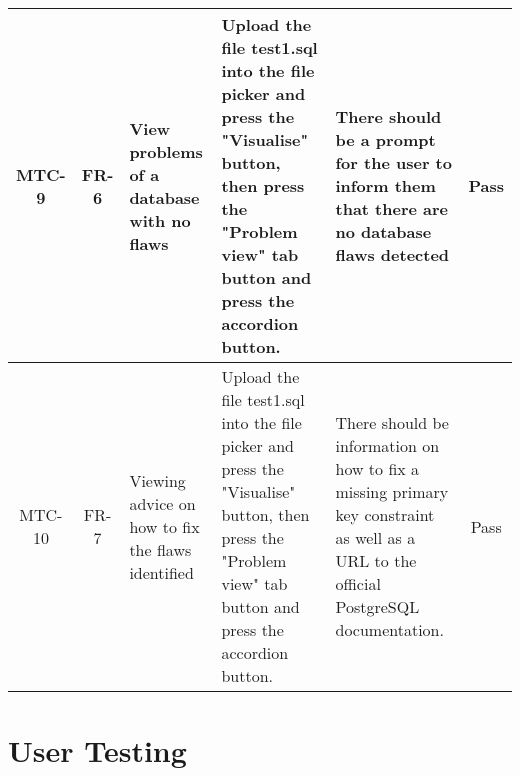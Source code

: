 \begin{center}
\begin{tabularx}{\textwidth}{|c|c|X|X|X|c|}
		\hline
		MTC-9 & FR-6 & View problems of a database with no flaws & Upload the file test1.sql into the file picker and press the "Visualise" button, then press the "Problem view" tab button and press the accordion button. & There should be a prompt for the user to inform them that there are no database flaws detected & Pass \\
		\hline
		MTC-10 & FR-7 & Viewing advice on how to fix the flaws identified & Upload the file test1.sql into the file picker and press the "Visualise" button, then press the "Problem view" tab button and press the accordion button. & There should be information on how to fix a missing primary key constraint as well as a URL to the official PostgreSQL documentation. & Pass \\
		\hline
	\end{tabularx}
\end{center}

\section{User Testing}

